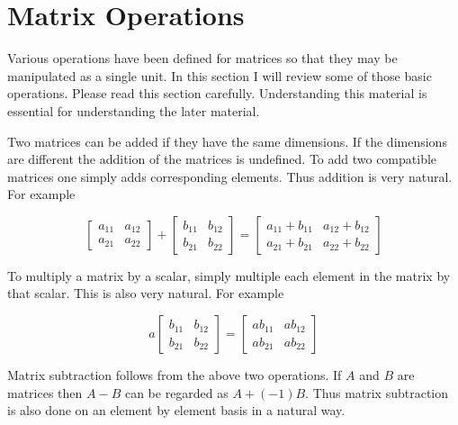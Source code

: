 
\section{Matrix Operations}
\label{sec:matrix-operations}

Various operations have been defined for matrices so that they may be manipulated as a single
unit. In this section I will review some of those basic operations. Please read this section
carefully. Understanding this material is essential for understanding the later material.

Two matrices can be added if they have the same dimensions. If the dimensions are different the
addition of the matrices is undefined. To add two compatible matrices one simply adds
corresponding elements. Thus addition is very natural. For example

\begin{displaymath}
\left[
\begin{array}{cc}
  a_{11} & a_{12} \\
  a_{21} & a_{22}
\end{array}
\right] +
\left[
\begin{array}{cc}
  b_{11} & b_{12} \\
  b_{21} & b_{22}
\end{array}
\right] =
\left[
\begin{array}{cc}
  a_{11} + b_{11} & a_{12} + b_{12} \\
  a_{21} + b_{21} & a_{22} + b_{22}
\end{array}
\right]
\end{displaymath}

To multiply a matrix by a scalar, simply multiple each element in the matrix by that scalar.
This is also very natural. For example

\begin{displaymath}
a \left[
\begin{array}{cc}
  b_{11} & b_{12} \\
  b_{21} & b_{22}
\end{array}
\right] =
\left[
\begin{array}{cc}
  a b_{11} & a b_{12} \\
  a b_{21} & a b_{22}
\end{array}
\right]
\end{displaymath}

Matrix subtraction follows from the above two operations. If $A$ and $B$ are matrices then $A -
B$ can be regarded as $A + (-1)B$. Thus matrix subtraction is also done on an element by element
basis in a natural way.

